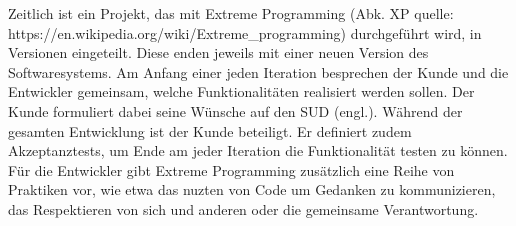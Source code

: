 \begin{parlist}
\begin{enumerate}
	\end{enumerate}
	\item Zeitlich ist ein Projekt, das mit Extreme Programming (Abk. XP quelle: https://en.wikipedia.org/wiki/Extreme_programming) durchgeführt wird,
in Versionen eingeteilt. Diese enden jeweils mit einer neuen Version des Softwaresystems. Am Anfang einer jeden Iteration besprechen der Kunde und die
Entwickler gemeinsam, welche Funktionalitäten realisiert werden sollen. Der Kunde
formuliert dabei seine Wünsche auf den SUD (engl.). Während der gesamten
Entwicklung ist der Kunde beteiligt. Er definiert zudem Akzeptanztests,
um Ende am jeder Iteration die Funktionalität testen zu können. Für die Entwickler gibt Extreme Programming zusätzlich eine Reihe von Praktiken vor, wie etwa
das nuzten von Code um Gedanken zu kommunizieren, das Respektieren von sich und anderen oder die gemeinsame Verantwortung.
\end{parlist}
